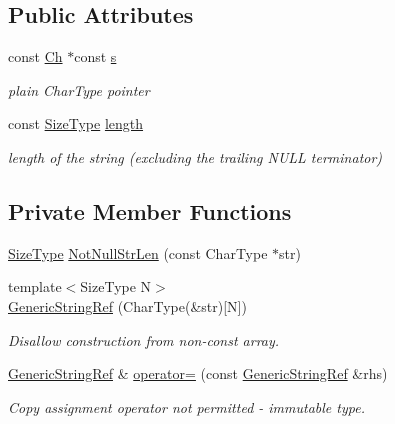 \subsection*{Public Attributes}
\begin{DoxyCompactItemize}
\item 
const \hyperlink{structGenericStringRef_a16908c3fce41be380061330c14ba2140}{Ch} $\ast$const \hyperlink{structGenericStringRef_ac555994afd329bc9bc1780acf2f9d9be}{s}
\begin{DoxyCompactList}\small\item\em plain Char\+Type pointer \end{DoxyCompactList}\item 
const \hyperlink{rapidjson_8h_a5ed6e6e67250fadbd041127e6386dcb5}{Size\+Type} \hyperlink{structGenericStringRef_a4a96d618744ad73f766a1551b1d517fe}{length}
\begin{DoxyCompactList}\small\item\em length of the string (excluding the trailing N\+U\+LL terminator) \end{DoxyCompactList}\end{DoxyCompactItemize}
\subsection*{Private Member Functions}
\begin{DoxyCompactItemize}
\item 
\hyperlink{rapidjson_8h_a5ed6e6e67250fadbd041127e6386dcb5}{Size\+Type} \hyperlink{structGenericStringRef_af51482556048c13920f5564a48e8ad7d}{Not\+Null\+Str\+Len} (const Char\+Type $\ast$str)
\item 
{\footnotesize template$<$Size\+Type N$>$ }\\\hyperlink{structGenericStringRef_ac0d64ff2d8a84b4f5a4b4dc687f49301}{Generic\+String\+Ref} (Char\+Type(\&str)\mbox{[}N\mbox{]})
\begin{DoxyCompactList}\small\item\em Disallow construction from non-\/const array. \end{DoxyCompactList}\item 
\hyperlink{structGenericStringRef}{Generic\+String\+Ref} \& \hyperlink{structGenericStringRef_a261406ab4ca7aa3fdd02fc3d152f0d0b}{operator=} (const \hyperlink{structGenericStringRef}{Generic\+String\+Ref} \&rhs)
\begin{DoxyCompactList}\small\item\em Copy assignment operator not permitted -\/ immutable type. \end{DoxyCompactList}\end{DoxyCompactItemize}
